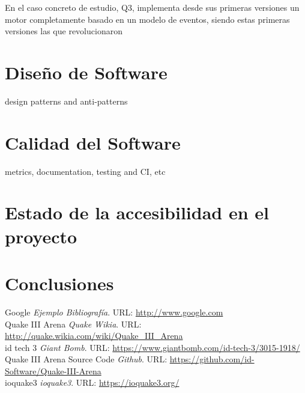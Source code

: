 \documentclass[a4paper,12pt]{report}
\begin{document}
\begin{itemize}
		
		
		En el caso concreto de estudio, Q3, implementa desde sus primeras versiones un motor completamente basado en un modelo de eventos, siendo estas primeras versiones las que revolucionaron
	
	\end{itemize}	
	
	
		
	\section{Diseño de Software}
	design patterns and anti-patterns\\
	
	\section{Calidad del Software}
	metrics, documentation, testing and CI, etc\\
	
	\section{Estado de la accesibilidad en el proyecto}
	
	\section{Conclusiones}
			
	
	
	
	
	
	\begin{thebibliography}{9}
		
		Google \emph{Ejemplo Bibliografía}. URL: \url{http://www.google.com}\\
		Quake III Arena \emph{Quake Wikia}. URL: \url{http://quake.wikia.com/wiki/Quake_III_Arena}\\
		 id tech 3 \emph{Giant Bomb}. URL: \url{https://www.giantbomb.com/id-tech-3/3015-1918/}\\
		 Quake III Arena Source Code \emph{Github}. URL: \url{https://github.com/id-Software/Quake-III-Arena}\\
		 ioquake3 \emph{ioquake3}. URL: \url{https://ioquake3.org/}
		
		
	\end{thebibliography}
	
	
\end{document}
